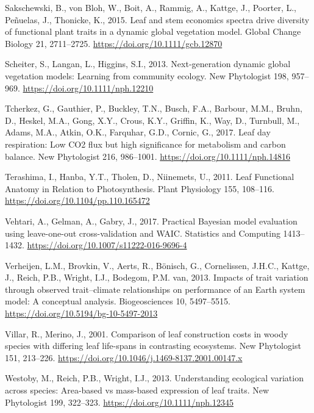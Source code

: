 \documentclass[
  12pt,
  letterpaper,
  DIV=11,
  numbers=noendperiod]{scrartcl}
\newlength{\cslhangindent}
\newenvironment{CSLReferences}[2] %
 {\begin{list}{}{%
  \setlength{\itemindent}{0pt}
  \setlength{\leftmargin}{0pt}
  \setlength{\parsep}{0pt}
  \ifodd #1
   \setlength{\leftmargin}{\cslhangindent}
   \setlength{\itemindent}{-1\cslhangindent}
  \fi
  \setlength{\itemsep}{#2\baselineskip}}}
 {\end{list}}
\begin{document}
\begin{CSLReferences}{1}{0}
Sakschewski, B., von Bloh, W., Boit, A., Rammig, A., Kattge, J.,
Poorter, L., Peñuelas, J., Thonicke, K., 2015. Leaf and stem economics
spectra drive diversity of functional plant traits in a dynamic global
vegetation model. Global Change Biology 21, 2711--2725.
\url{https://doi.org/10.1111/gcb.12870}

Scheiter, S., Langan, L., Higgins, S.I., 2013. Next-generation dynamic
global vegetation models: {Learning} from community ecology. New
Phytologist 198, 957--969. \url{https://doi.org/10.1111/nph.12210}

Tcherkez, G., Gauthier, P., Buckley, T.N., Busch, F.A., Barbour, M.M.,
Bruhn, D., Heskel, M.A., Gong, X.Y., Crous, K.Y., Griffin, K., Way, D.,
Turnbull, M., Adams, M.A., Atkin, O.K., Farquhar, G.D., Cornic, G.,
2017. Leaf day respiration: Low {CO2} flux but high significance for
metabolism and carbon balance. New Phytologist 216, 986--1001.
\url{https://doi.org/10.1111/nph.14816}

Terashima, I., Hanba, Y.T., Tholen, D., Niinemets, U., 2011. Leaf
{Functional Anatomy} in {Relation} to {Photosynthesis}. Plant Physiology
155, 108--116. \url{https://doi.org/10.1104/pp.110.165472}

Vehtari, A., Gelman, A., Gabry, J., 2017. Practical {Bayesian} model
evaluation using leave-one-out cross-validation and {WAIC}. Statistics
and Computing 1413--1432.
\url{https://doi.org/10.1007/s11222-016-9696-4}

Verheijen, L.M., Brovkin, V., Aerts, R., Bönisch, G., Cornelissen,
J.H.C., Kattge, J., Reich, P.B., Wright, I.J., Bodegom, P.M. van, 2013.
Impacts of trait variation through observed trait--climate relationships
on performance of an {Earth} system model: A conceptual analysis.
Biogeosciences 10, 5497--5515.
\url{https://doi.org/10.5194/bg-10-5497-2013}

Villar, R., Merino, J., 2001. Comparison of leaf construction costs in
woody species with differing leaf life-spans in contrasting ecosystems.
New Phytologist 151, 213--226.
\url{https://doi.org/10.1046/j.1469-8137.2001.00147.x}

Westoby, M., Reich, P.B., Wright, I.J., 2013. Understanding ecological
variation across species: {Area-based} vs mass-based expression of leaf
traits. New Phytologist 199, 322--323.
\url{https://doi.org/10.1111/nph.12345}


\end{CSLReferences}
\end{document}
